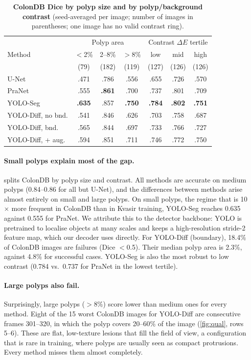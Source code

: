 \documentclass[10pt,twocolumn,letterpaper]{article}
\newcommand{\best}[1]{\textbf{#1}}
\begin{document}
\begin{table}[t]
\centering
\footnotesize
\setlength{\tabcolsep}{3pt}
\begin{tabular}{@{}lccc|ccc@{}}
\toprule
& \multicolumn{3}{c|}{Polyp area} & \multicolumn{3}{c}{Contrast $\Delta E$ tertile} \\
Method & $<$2\% & 2--8\% & $>$8\% & low & mid & high \\
& (79) & (182) & (119) & (127) & (126) & (126) \\
\midrule
U-Net & .471 & .786 & .556 & .655 & .726 & .570 \\
PraNet & .555 & \best{.861} & .700 & .737 & .801 & .709 \\
YOLO-Seg & \best{.635} & .857 & \best{.750} & \best{.784} & \best{.802} & \best{.751} \\
YOLO-Diff, no bnd. & .541 & .846 & .626 & .703 & .758 & .687 \\
YOLO-Diff, bnd. & .565 & .844 & .697 & .733 & .766 & .727 \\
YOLO-Diff, + aug. & .594 & .851 & .711 & .746 & .772 & .750 \\
\bottomrule
\end{tabular}
\caption{\textbf{ColonDB Dice by polyp size and by polyp/background contrast} (seed-averaged per image; number of images in parentheses; one image has no valid contrast ring).}
\label{tab:buckets}
\end{table}

\paragraph{Small polyps explain most of the gap.}  splits ColonDB by polyp size and contrast. All methods are accurate on medium polyps (0.84--0.86 for all but U-Net), and the differences between methods arise almost entirely on small and large polyps. On small polyps, the regime that is 10$\times$ more frequent in ColonDB than in Kvasir training, YOLO-Seg reaches 0.635 against 0.555 for PraNet. We attribute this to the detector backbone: YOLO is pretrained to localise objects at many scales and keeps a high-resolution stride-2 feature map, which our decoder uses directly. For YOLO-Diff (boundary), 18.4\% of ColonDB images are failures (Dice $<$0.5). Their median polyp area is 2.3\%, against 4.8\% for successful cases. YOLO-Seg is also the most robust to low contrast (0.784 vs.\ 0.737 for PraNet in the lowest tertile).

\paragraph{Large polyps also fail.} Surprisingly, large polyps ($>$8\%) score lower than medium ones for every method. Eight of the 15 worst ColonDB images for YOLO-Diff are consecutive frames 301--320, in which the polyp covers 20--60\% of the image (\cref{fig:qual}, rows 5--6). These are flat, low-texture lesions that fill the field of view, a configuration that is rare in training, where polyps are usually seen as compact protrusions. Every method misses them almost completely.
\end{document}
